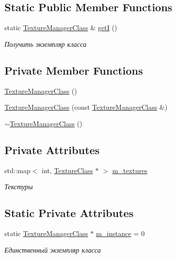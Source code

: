 \subsection*{Static Public Member Functions}
\begin{DoxyCompactItemize}
\item 
static \hyperlink{class_texture_manager_class}{Texture\+Manager\+Class} \& \hyperlink{class_texture_manager_class_ab038ef11eeac2070d9dad46d01764b00}{getI} ()
\begin{DoxyCompactList}\small\item\em Получить экземпляр класса \end{DoxyCompactList}\end{DoxyCompactItemize}
\subsection*{Private Member Functions}
\begin{DoxyCompactItemize}
\item 
\hyperlink{class_texture_manager_class_a1eff93242d76f15bc485bcc4dfd0eec0}{Texture\+Manager\+Class} ()
\item 
\hyperlink{class_texture_manager_class_ae8efa5d97e1f1ebf88c79a5a5a857724}{Texture\+Manager\+Class} (const \hyperlink{class_texture_manager_class}{Texture\+Manager\+Class} \&)
\item 
\hyperlink{class_texture_manager_class_a3ef8b2a40fe0093b95ff7b25daf70c48}{$\sim$\+Texture\+Manager\+Class} ()
\end{DoxyCompactItemize}
\subsection*{Private Attributes}
\begin{DoxyCompactItemize}
\item 
std\+::map$<$ int, \hyperlink{class_texture_class}{Texture\+Class} $\ast$ $>$ \hyperlink{class_texture_manager_class_aaee9fefd9e5b63065b08a241dd929adb}{m\+\_\+textures}
\begin{DoxyCompactList}\small\item\em Текстуры \end{DoxyCompactList}\end{DoxyCompactItemize}
\subsection*{Static Private Attributes}
\begin{DoxyCompactItemize}
\item 
static \hyperlink{class_texture_manager_class}{Texture\+Manager\+Class} $\ast$ \hyperlink{class_texture_manager_class_a3e321fcca989640ab4545d2f46cf8cde}{m\+\_\+instance} = 0
\begin{DoxyCompactList}\small\item\em Единственный экземпляр класса \end{DoxyCompactList}\end{DoxyCompactItemize}


